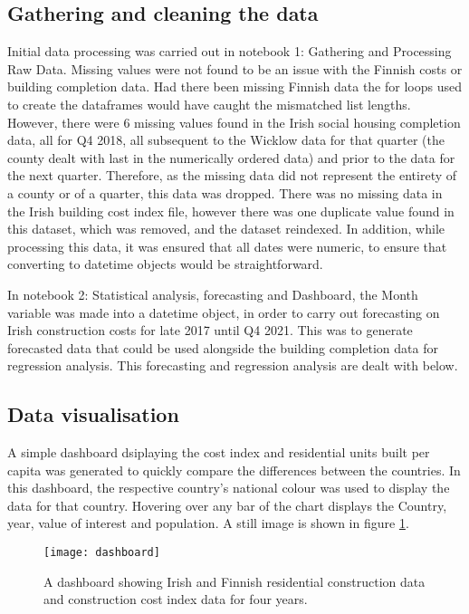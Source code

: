 \documentclass[hidelinks,12pt,oneside]{report} %
\begin{document}
\subsection{Gathering and cleaning the data}
Initial data processing was carried out in notebook 1: Gathering and Processing Raw Data. Missing values were not found to be an issue with the  Finnish costs or building completion data. Had there been missing Finnish data the for loops used to create the dataframes would have caught the mismatched list lengths. However, there were 6 missing values found in the Irish social housing completion data, all for Q4 2018, all subsequent to the Wicklow data for that quarter (the county dealt with last in the numerically ordered data) and prior to the data for the next quarter.  Therefore, as the missing data did not represent the entirety of a county or of a quarter, this data was dropped. There was no missing data in the Irish building cost index file, however there was one duplicate value found in this dataset, which was removed, and the dataset reindexed. In addition, while processing this data, it was ensured that all dates were numeric, to ensure that converting to datetime objects would be straightforward.

In notebook 2: Statistical analysis, forecasting and Dashboard, the Month variable was made into a datetime object, in order to carry out forecasting on Irish construction costs for late 2017 until Q4 2021. This was to generate forecasted data that could be used alongside the building completion data for regression analysis. This forecasting and regression analysis are dealt with below.

\subsection{Data visualisation}
A simple dashboard dsiplaying the cost index and residential units built per capita was generated to quickly compare the differences between the countries. In this dashboard, the respective country's national colour was used to display the data for that country. Hovering over any bar of the chart displays the Country, year, value of interest and population. A still image is shown in figure \ref{fig:dashboard}.

\begin{figure}[!ht]
	\centering
	\vspace{.4218cm}
		\texttt{[image: dashboard]}	\captionsetup{justification=justified,width=1\linewidth}
	\caption{A dashboard showing Irish and Finnish residential construction data and construction cost index data for four years.}
\label{fig:dashboard}
\end{figure}
\end{document}
